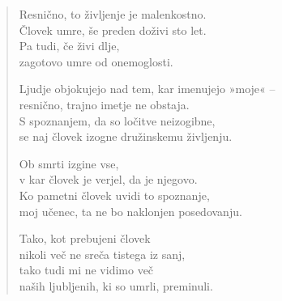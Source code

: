 \begin{verse}


Resnično, to življenje je malenkostno.\\
Človek umre, še preden doživi sto let.\\
Pa tudi, če živi dlje,\\
zagotovo umre od onemoglosti.

Ljudje objokujejo nad tem, kar imenujejo »moje« --\\
resnično, trajno imetje ne obstaja.\\
S spoznanjem, da so ločitve neizogibne,\\
se naj človek izogne družinskemu življenju.

Ob smrti izgine vse,\\
v kar človek je verjel, da je njegovo.\\
Ko pametni človek uvidi to spoznanje,\\
moj učenec, ta ne bo naklonjen posedovanju.

Tako, kot prebujeni človek\\
nikoli več ne sreča tistega iz sanj,\\
tako tudi mi ne vidimo več\\
naših ljubljenih, ki so umrli, preminuli.

\end{verse}


